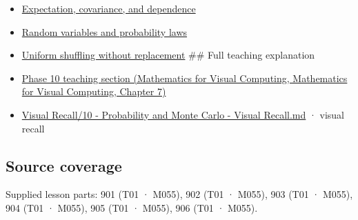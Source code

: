 \begin{itemize}
\item
  \hyperref[appendix-54c383df9992]{Expectation, covariance, and dependence}
\item
  \hyperref[appendix-4d0203f7944f]{Random variables and probability laws}
\item
  \hyperref[appendix-184fcc411663]{Uniform shuffling without replacement} \#\# Full teaching explanation
\item
  \href{../02-Mathematics-for-Visual-Computing/main.pdf\#nameddest=02-foundations-ii-ch023-a-probability-model-begins-with-possible-outcomes}{Phase 10 teaching section (Mathematics for Visual Computing, Mathematics for Visual Computing, Chapter 7)}
\item
  \hyperref[appendix-cb5af353ef77]{Visual Recall/10 - Probability and Monte Carlo - Visual Recall.md} · visual recall
\end{itemize}

\subsection{Source coverage}\label{appendix-f1ef323f6ed7-source-coverage}

Supplied lesson parts: 901 (T01 · M055), 902 (T01 · M055), 903 (T01 · M055), 904 (T01 · M055), 905 (T01 · M055), 906 (T01 · M055).
